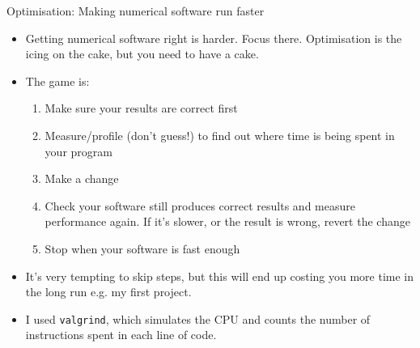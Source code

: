 \documentclass{beamer}
\begin{document}
\begin{frame}{Optimisation: Making numerical software run faster}
\begin{itemize}
\item Getting numerical software right is harder. Focus there. Optimisation is the icing on the cake, but
			you need to have a cake.
\item The game is: 
\begin{enumerate}
\item Make sure your results are correct first
\item Measure/profile (don't guess!) to find out where time is being spent in your program
\item Make a change
\item Check your software still produces correct results and measure performance again. If it's slower, or the result is wrong, revert the change
\item Stop when your software is fast enough
\end{enumerate}
\item It's very tempting to skip steps, but this will end up costing you more time in the long run e.g.
		my first project.
\item I used \texttt{valgrind}, which simulates the CPU and counts the number of instructions spent in each
	  line of code. \end{itemize}
\end{frame}
\end{document}
